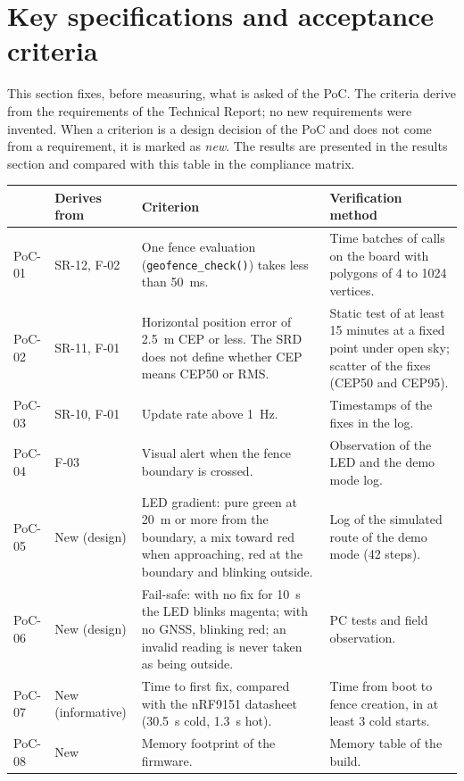 \section{Key specifications and acceptance criteria}

This section fixes, before measuring, what is asked of the PoC. The criteria derive from the requirements
of the Technical Report; no new requirements were invented. When a criterion is a design decision of the
PoC and does not come from a requirement, it is marked as \emph{new}. The results are presented in the
results section and compared with this table in the compliance matrix.

\begin{table}[H]
\centering
\footnotesize
\begin{tabularx}{\textwidth}{|l l X X|}
\hline
\tablehead{\textbf{ID} & \textbf{Derives from} & \textbf{Criterion} & \textbf{Verification method}} \\ \hline
PoC-01 & SR-12, F-02 & One fence evaluation (\texttt{geofence\_check()}) takes less than 50~ms. & Time batches of calls on the board with polygons of 4 to 1024 vertices. \\ \hline
PoC-02 & SR-11, F-01 & Horizontal position error of 2.5~m CEP or less. The SRD does not define whether CEP means CEP50 or RMS. & Static test of at least 15 minutes at a fixed point under open sky; scatter of the fixes (CEP50 and CEP95). \\ \hline
PoC-03 & SR-10, F-01 & Update rate above 1~Hz. & Timestamps of the fixes in the log. \\ \hline
PoC-04 & F-03 & Visual alert when the fence boundary is crossed. & Observation of the LED and the demo mode log. \\ \hline
PoC-05 & New (design) & LED gradient: pure green at 20~m or more from the boundary, a mix toward red when approaching, red at the boundary and blinking outside. & Log of the simulated route of the demo mode (42 steps). \\ \hline
PoC-06 & New (design) & Fail-safe: with no fix for 10~s the LED blinks magenta; with no GNSS, blinking red; an invalid reading is never taken as being outside. & PC tests and field observation. \\ \hline
PoC-07 & New (informative) & Time to first fix, compared with the nRF9151 datasheet (30.5~s cold, 1.3~s hot). & Time from boot to fence creation, in at least 3 cold starts. \\ \hline
PoC-08 & New & Memory footprint of the firmware. & Memory table of the build. \\ \hline

\end{tabularx}
\end{table}
